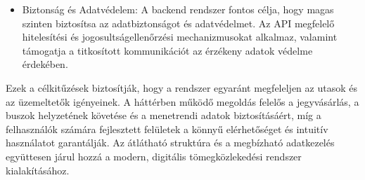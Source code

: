 \begin{itemize}
    \item Biztonság és Adatvédelem: A backend rendszer fontos célja, hogy magas szinten biztosítsa az adatbiztonságot és adatvédelmet. Az API megfelelő hitelesítési és jogosultságellenőrzési mechanizmusokat alkalmaz, valamint támogatja a titkosított kommunikációt az érzékeny adatok védelme érdekében.

\end{itemize}

Ezek a célkitűzések biztosítják, hogy a rendszer egyaránt megfeleljen az utasok és az üzemeltetők igényeinek. A háttérben működő megoldás felelős a jegyvásárlás, a buszok helyzetének követése és a menetrendi adatok biztosításáért, míg a felhasználók számára fejlesztett felületek a könnyű elérhetőséget és intuitív használatot garantálják. Az átlátható struktúra és a megbízható adatkezelés együttesen járul hozzá a modern, digitális tömegközlekedési rendszer kialakításához.